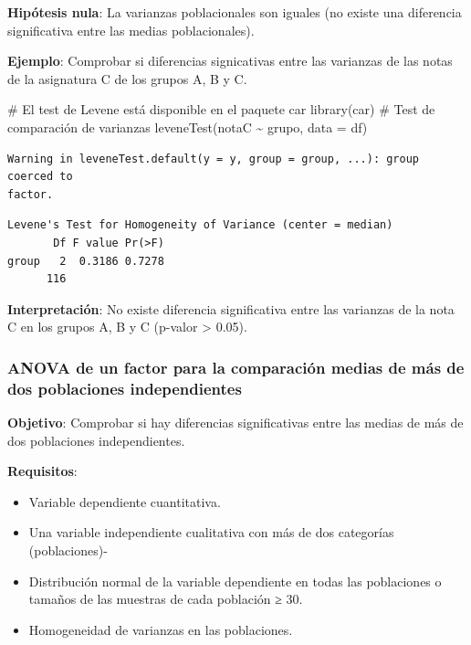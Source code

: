 \documentclass[
  a4paper,
]{scrreport}
\newenvironment{Shaded}{\begin{snugshade}}{\end{snugshade}}
\newcommand{\AttributeTok}[1]{\textcolor[rgb]{0.40,0.45,0.13}{#1}}
\newcommand{\CommentTok}[1]{\textcolor[rgb]{0.37,0.37,0.37}{#1}}
\newcommand{\FunctionTok}[1]{\textcolor[rgb]{0.28,0.35,0.67}{#1}}
\newcommand{\NormalTok}[1]{\textcolor[rgb]{0.00,0.23,0.31}{#1}}
\newcommand{\SpecialCharTok}[1]{\textcolor[rgb]{0.37,0.37,0.37}{#1}}
\providecommand{\tightlist}{%
  \setlength{\itemsep}{0pt}\setlength{\parskip}{0pt}}\usepackage{longtable,booktabs,array}
\theoremstyle{definition}
\theoremstyle{definition}
\theoremstyle{remark}
\begin{document}
\textbf{Hipótesis nula}: La varianzas poblacionales son iguales (no
existe una diferencia significativa entre las medias poblacionales).

\textbf{Ejemplo}: Comprobar si diferencias signicativas entre las
varianzas de las notas de la asignatura C de los grupos A, B y C.

\begin{Shaded}
\begin{Highlighting}[]
\CommentTok{\# El test de Levene está disponible en el paquete car}
\FunctionTok{library}\NormalTok{(car)}
\CommentTok{\# Test de comparación de varianzas}
\FunctionTok{leveneTest}\NormalTok{(notaC }\SpecialCharTok{\textasciitilde{}}\NormalTok{ grupo, }\AttributeTok{data =}\NormalTok{ df)}
\end{Highlighting}
\end{Shaded}

\begin{verbatim}
Warning in leveneTest.default(y = y, group = group, ...): group coerced to
factor.
\end{verbatim}

\begin{verbatim}
Levene's Test for Homogeneity of Variance (center = median)
       Df F value Pr(>F)
group   2  0.3186 0.7278
      116               
\end{verbatim}

\textbf{Interpretación}: No existe diferencia significativa entre las
varianzas de la nota C en los grupos A, B y C (p-valor \textgreater{}
0.05).

\subsubsection{ANOVA de un factor para la comparación medias de más de
dos poblaciones
independientes}\label{anova-de-un-factor-para-la-comparaciuxf3n-medias-de-muxe1s-de-dos-poblaciones-independientes}

\textbf{Objetivo}: Comprobar si hay diferencias significativas entre las
medias de más de dos poblaciones independientes.

\textbf{Requisitos}:

\begin{itemize}
\tightlist
\item
  Variable dependiente cuantitativa.
\item
  Una variable independiente cualitativa con más de dos categorías
  (poblaciones)-
\item
  Distribución normal de la variable dependiente en todas las
  poblaciones o tamaños de las muestras de cada población ≥ 30.
\item
  Homogeneidad de varianzas en las poblaciones.
\end{itemize}
\end{document}
